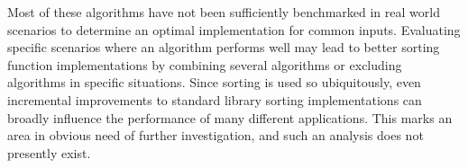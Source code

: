 \documentclass[letter, 12pt, conference]{ieeeconf}
\newcommand{\todocite}{\colorbox{red}{CITE}}
\begin{document}
\begin{table}[ht]
	\centering
	\caption{Sorting algorithm asymptotic time complexities \todocite}
	\label{fig:time_complexity_table}
\end{table}

Most of these algorithms have not been sufficiently benchmarked in real world
scenarios to determine an optimal implementation for common inputs. Evaluating
specific scenarios where an algorithm performs well may lead to better sorting
function implementations by combining several algorithms or excluding algorithms
in specific situations. Since sorting is used so ubiquitously, even incremental
improvements to standard library sorting implementations can broadly influence
the performance of many different applications. This marks an area in obvious
need of further investigation, and such an analysis does not presently exist.
\end{document}
